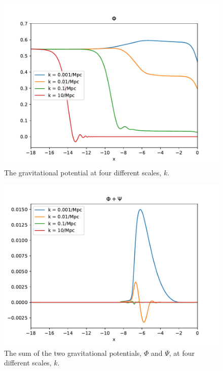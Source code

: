\documentclass{aa}
\begin{document}
\begin{figure}[h!]
   \includegraphics[scale=0.6]{../figures/milestone3/phi.pdf}
   \caption{The gravitational potential at four different scales, $k$.}\label{fig:phi}
\end{figure}

\begin{figure}[h!]
   \includegraphics[scale=0.6]{../figures/milestone3/phi_psi.pdf}
   \caption{The sum of the two gravitational potentials, $\Phi$ and $\Psi$, at four different scales, $k$.}\label{fig:phi_psi}
\end{figure}
\end{document}
